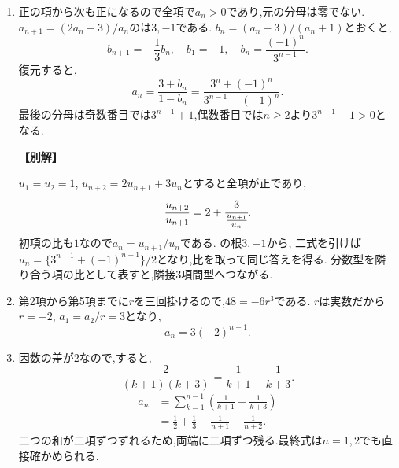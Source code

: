\begin{enumerate}[label=\textbf{問\arabic*.},leftmargin=3.8em,format=\bookitemlink{practice-basic}{solution}{problem}]
          \item 正の項から次も正になるので全項で$a_n>0$であり,元の分母は零でない.
                  $a_{n+1}=(2a_n+3)/a_n$のは$3,-1$である.
                  $b_n=(a_n-3)/(a_n+1)$とおくと,
                  \[
                    b_{n+1}=-\frac13b_n,\quad b_1=-1,
                    \quad b_n=\frac{(-1)^n}{3^{n-1}}.
                  \]
                  復元すると,
                  \[
                    a_n=\frac{3+b_n}{1-b_n}
                       =\frac{3^n+(-1)^n}{3^{n-1}-(-1)^n}.
                  \]
                  最後の分母は奇数番目では$3^{n-1}+1$,偶数番目では$n\ge2$より$3^{n-1}-1>0$となる.
                  \par\smallskip\noindent\textbf{【別解】}\par
                  $u_1=u_2=1$, $u_{n+2}=2u_{n+1}+3u_n$とすると全項が正であり,
                  \[
                    \frac{u_{n+2}}{u_{n+1}}=2+\cfrac3{\frac{u_{n+1}}{u_n}}.
                  \]
                  初項の比も$1$なので$a_n=u_{n+1}/u_n$である.
                  の根$3,-1$から,
                  \BookMathLayout{\[
                    u_{n+1}+u_n=2\cdot3^{n-1},
                    \quad u_{n+1}-3u_n=-2(-1)^{n-1}.
                  \]}{\[
                  \begin{aligned}
                    u_{n+1}+u_n&=2\cdot3^{n-1},\\
                    u_{n+1}-3u_n&=-2(-1)^{n-1}.
                  \end{aligned}
                  \]}
                  二式を引けば$u_n=\{3^{n-1}+(-1)^{n-1}\}/2$となり,比を取って同じ答えを得る.
                  分数型を隣り合う項の比として表すと,隣接3項間型へつながる.

          \item 第2項から第5項までに$r$を三回掛けるので,$48=-6r^3$である.
                  $r$は実数だから$r=-2$, $a_1=a_2/r=3$となり,
                  \[
                    a_n=3(-2)^{n-1}.
                  \]

          \item 因数の差が$2$なので,すると,
                  \[
                    \frac2{(k+1)(k+3)}=\frac1{k+1}-\frac1{k+3}.
                  \]
                  \[
                  \begin{aligned}
                    a_n&=\sum_{k=1}^{n-1}\left(\frac1{k+1}-\frac1{k+3}\right)\\
                       &=\frac12+\frac13-\frac1{n+1}-\frac1{n+2}.
                  \end{aligned}
                  \]
                  二つの和が二項ずつずれるため,両端に二項ずつ残る.最終式は$n=1,2$でも直接確かめられる.


\end{enumerate}
